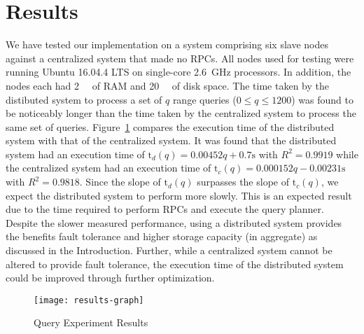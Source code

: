 \section{Results}
We have tested our implementation on a system comprising six slave nodes
against a centralized system that made no RPCs. All nodes used for testing were
running Ubuntu 16.04.4 LTS on single-core \SI{2.6}{\giga\hertz} processors. In
addition, the nodes each had \SI{2}{\gibi\byte} of RAM and \SI{20}{\gibi\byte}
of disk space. The time taken by the distibuted system to process a set of
\(q\) range queries (\(0 \leq q \leq 1200\)) was found to be noticeably longer
than the time taken by the centralized system to process the same set of
queries. Figure~\ref{fig:graph-of-results} compares the execution time of the
distributed system with that of the centralized system. It was found that the
distributed system had an execution time of
\(\mathrm{t}_d(q) = 0.00452 q + 0.7 \mathrm{s}\)
with \(R^2 = 0.9919\) while the centralized system had an execution time of
\(\mathrm{t}_c(q) = 0.000152 q - 0.00231 \mathrm{s}\)
with \(R^2 = 0.9818\). Since the slope of \(\mathrm{t}_d(q)\) surpasses the
slope of \(\mathrm{t}_c(q)\), we expect the distributed system to perform more
slowly. This is an expected result due to the time required to perform RPCs and
execute the query planner. Despite the slower measured performance, using a
distributed system provides the benefits fault tolerance and higher storage
capacity (in aggregate) as discussed in the Introduction. Further, while a
centralized system cannot be altered to provide fault tolerance, the execution
time of the distributed system could be improved through further optimization.
%
\begin{figure}
    \centering
    \texttt{[image: results-graph]}
    \caption{Query Experiment Results}\label{fig:graph-of-results}
\end{figure}
